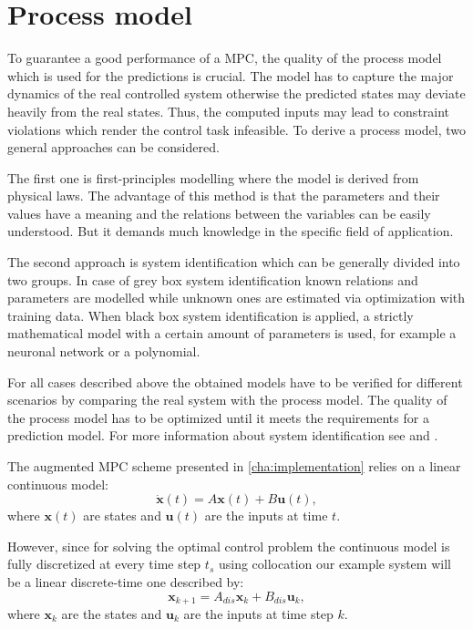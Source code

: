 
\section{Process model}
\label{sec:processmodel}

To guarantee a good performance of a MPC, the quality of the process model which is used for the predictions is crucial.
The model has to capture the major dynamics of the real controlled system otherwise the predicted states may deviate heavily from the real states.
Thus, the computed inputs may lead to constraint violations which render the control task infeasible.
To derive a process model, two general approaches can be considered.

The first one is first-principles modelling where the model is derived from physical laws.
The advantage of this method is that the parameters and their values have a meaning and the relations between the variables can be easily understood.
But it demands much knowledge in the specific field of application.

The second approach is system identification which can be generally divided into two groups.
In case of grey box system identification known relations and parameters are modelled while unknown ones are estimated via optimization with training data.
When black box system identification is applied, a strictly mathematical model with a certain amount of parameters is used, for example a neuronal network or a polynomial.

For all cases described above the obtained models have to be verified for different scenarios by comparing the real system with the process model.
The quality of the process model has to be optimized until it meets the requirements for a prediction model.
For more information about system identification see \cite{Isermann.2011} and \cite{Ljung.2012}.

The augmented MPC scheme presented in \cref{cha:implementation} relies on a linear continuous model:
\begin{equation}\label{eq:linss_cont}
\dot{\mathbf{x}}(t) = A\mathbf{x}(t)+B\mathbf{u}(t),
\end{equation}
where $\mathbf{x}(t)$ are states and $\mathbf{u}(t)$ are the inputs at time $t$.

However, since for solving the optimal control problem the continuous model is fully discretized at every time step $t_s$ using collocation our example system will be a linear discrete-time one described by:
\begin{equation}\label{eq:linss}
\mathbf{x}_{k+1}=A_{dis}\mathbf{x}_k+B_{dis}\mathbf{u}_k,
\end{equation}
where $\mathbf{x}_k$ are the states and $\mathbf{u}_k$ are the inputs at time step $k$.

